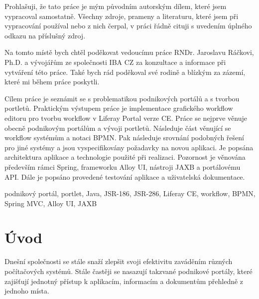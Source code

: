 \documentclass{fithesis}
\begin{document}
\FrontMatter
\ThesisTitlePage

\begin{ThesisDeclaration}
Prohlašuji, že tato práce je mým původním autorským dílem, které jsem
vypracoval samostatně. Všechny zdroje, prameny a literaturu, které jsem při
vypracování používal nebo z nich čerpal, v práci řádně cituji s uvedením
úplného odkazu na příslušný zdroj.\AdvisorName
\end{ThesisDeclaration}

\begin{ThesisThanks}
Na tomto místě bych chtěl poděkovat vedoucímu práce RNDr. Jaroslavu Ráčkovi, Ph.D. a vývojářům ze společnosti IBA CZ za konzultace a informace při vytváření této práce. Také bych rád poděkoval své rodině a blízkým za zázemí, které mi během práce poskytli.
\end{ThesisThanks}

\begin{ThesisAbstract}
Cílem práce je seznámit se s problematikou podnikových portálů a s tvorbou portletů. Praktickým výstupem práce je implementace grafického workflow editoru pro tvorbu workflow v Liferay Portal verze CE. Práce se nejprve věnuje obecně podnikovým portálům a vývoji portletů. Následuje část věnující se workflow systémům a notaci BPMN. Pak následuje srovnání podobných řešení pro jiné systémy a jsou vyspecifikovány požadavky na novou aplikaci. Je popsána architektura aplikace a technologie použité při realizaci. Pozornost je věnována především rámci Spring, frameworku Alloy UI, nástroji JAXB a portálovému API. Dále je popsáno provedené testování aplikace a uživatelská dokumentace.
\end{ThesisAbstract}

\begin{ThesisKeyWords}
podnikový portál, portlet, Java, JSR-186, JSR-286, Liferay CE, workflow, BPMN, Spring MVC, Alloy UI, JAXB
\end{ThesisKeyWords}


\MainMatter
\setcounter{secnumdepth}{4}
\tableofcontents

\chapter*{Úvod}
Dnešní společnosti se stále snaží zlepšit svoji efektivitu zaváděním různých počítačových systémů. Stále častěji se nasazují takzvané podnikové portály, které zajišťují jednotný přístup k aplikacím, informacím a dokumentům přehledně z jednoho místa.
\end{document}
